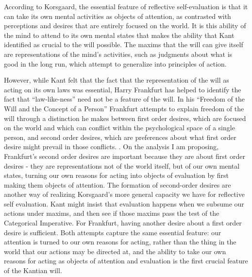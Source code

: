 \documentclass[phd,12pt,oneside,paper=letterpaper]{ubcthesis}
\begin{document}
According to Korsgaard, the essential feature of reflective self-evaluation is that it can take its own mental activities as objects of attention, as contrasted with perceptions and desires that are entirely focused on the world. It is this ability of the mind to attend to its own mental states that makes the ability that Kant identified as crucial to the will possible. The maxims that the will can give itself are representations of the mind's activities, such as judgments about what is good in the long run, which attempt to generalize into principles of action.

However, while Kant felt that the fact that the representation of the will as acting on its own laws was essential, Harry Frankfurt has helped to identify the fact that ``law-like-ness'' need not be a feature of the will. In his ``Freedom of the Will and the Concept of a Person'' Frankfurt attempts to explain freedom of the will through a distinction he makes between first order desires, which are focused on the world and which can conflict within the psychological space of a single person, and second order desires, which are preferences about what first order desire might prevail in those conflicts. \citep{frankfurt1969}. On the analysis I am proposing, Frankfurt's second order desires are important because they are about first order desires - they are representations not of the world itself, but of our own mental states, turning our own reasons for acting into objects of evaluation by first making them objects of attention. The formation of second-order desires are another way of realizing Korsgaard's more general capacity we have for reflective self evaluation. Kant might insist that evaluation happens when we subsume our actions under maxims, and then see if those maxims pass the test of the Categorical Imperative. For Frankfurt, having another desire about a first order desire is sufficient. Both attempts capture the same essential feature: our attention is turned to our own reasons for acting, rather than the thing in the world that our actions may be directed at, and the ability to take our own reasons for acting as objects of attention and evaluation is the first crucial feature of the Kantian will. 
\end{document}
